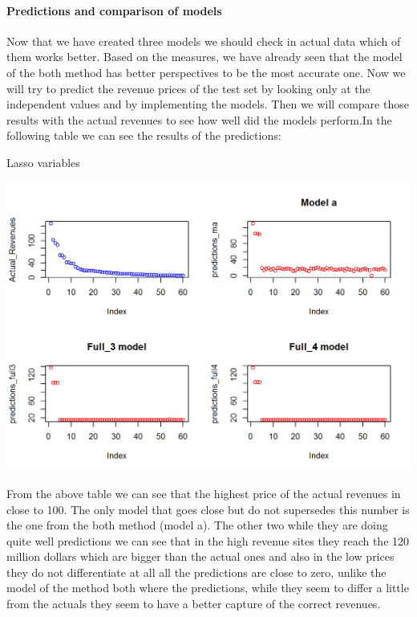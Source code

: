 \documentclass{article}
\begin{document}
\paragraph{Predictions and comparison of models}
Now that we have created three models we should check in actual data which of them works better. Based on the measures, we have already seen that the model of the both method has better perspectives to be the most accurate one. Now we will try to predict the revenue prices of the test set by looking only at the independent values and by implementing the models. Then we will compare those results with the actual revenues to see how well did the models perform.In the following table we can see the results of the predictions:
\begin{table}[H]
\centering
\caption{Lasso variables}
\begin{center}
\includegraphics[scale=0.5]{../R/photos/85_pred_mod.png}    \\
\end{center}
\end{table}
From the above table we can see that the highest price of the actual revenues in close to 100. The only model that goes close but do not supersedes this number is the one from the both method (model a). The other two while they are doing quite well predictions we can see that in the high revenue sites they reach the 120 million dollars which are bigger than the actual ones and also in the low prices they do not differentiate at all all the predictions are close to zero, unlike the model of the method both where the predictions, while they seem to differ a little from the actuals they seem to have a better capture of the correct revenues.\\
\end{document}
